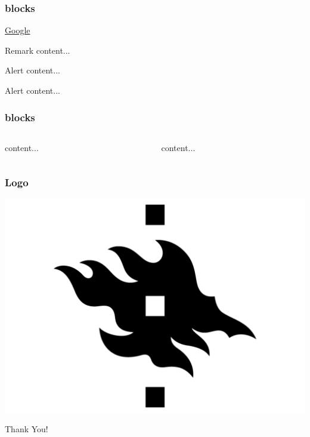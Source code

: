 \documentclass[aspectratio=169]{beamer}
\begin{document}
\begin{frame}
    \frametitle{blocks}
    
    \href{www.google.com}{Google}

    \begin{block}{Remark}
        content...
    \end{block}

    \begin{alertblock}{Alert}
        content...
    \end{alertblock}

    \begin{examples}{Alert}
        content...
    \end{examples}
        
\end{frame}


\begin{frame}
\frametitle{blocks}

    \begin{columns}
        \begin{column}{.4\textwidth}
            content...
        \end{column}
        \begin{column}{.4\textwidth}
            content...
        \end{column}
    \end{columns}

\end{frame}


\begin{frame}
    \frametitle{Logo}
    \begin{center}
        \includegraphics[width=0.5\paperwidth]{graphics/logo-uh}
    \end{center}
\end{frame}


\begin{frame}
    \begin{center}
        \Huge Thank You!
    \end{center}
\end{frame}
\end{document}
